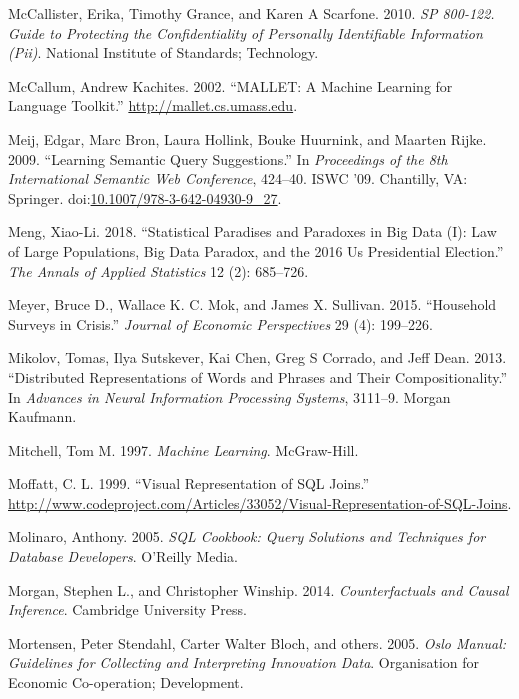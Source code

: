 \documentclass[]{krantz}
\begin{document}
\hypertarget{ref-mccallister2010sp}{}
McCallister, Erika, Timothy Grance, and Karen A Scarfone. 2010. \emph{SP
800-122. Guide to Protecting the Confidentiality of Personally
Identifiable Information (Pii)}. National Institute of Standards;
Technology.

\hypertarget{ref-mallet}{}
McCallum, Andrew Kachites. 2002. ``MALLET: A Machine Learning for
Language Toolkit.'' \url{http://mallet.cs.umass.edu}.

\hypertarget{ref-meij-09}{}
Meij, Edgar, Marc Bron, Laura Hollink, Bouke Huurnink, and Maarten
Rijke. 2009. ``Learning Semantic Query Suggestions.'' In
\emph{Proceedings of the 8th International Semantic Web Conference},
424--40. ISWC '09. Chantilly, VA: Springer.
doi:\href{https://doi.org/10.1007/978-3-642-04930-9_27}{10.1007/978-3-642-04930-9\_27}.

\hypertarget{ref-meng2018}{}
Meng, Xiao-Li. 2018. ``Statistical Paradises and Paradoxes in Big Data
(I): Law of Large Populations, Big Data Paradox, and the 2016 Us
Presidential Election.'' \emph{The Annals of Applied Statistics} 12 (2):
685--726.

\hypertarget{ref-Meyer2015}{}
Meyer, Bruce D., Wallace K. C. Mok, and James X. Sullivan. 2015.
``Household Surveys in Crisis.'' \emph{Journal of Economic Perspectives}
29 (4): 199--226.

\hypertarget{ref-mikolov-13}{}
Mikolov, Tomas, Ilya Sutskever, Kai Chen, Greg S Corrado, and Jeff Dean.
2013. ``Distributed Representations of Words and Phrases and Their
Compositionality.'' In \emph{Advances in Neural Information Processing
Systems}, 3111--9. Morgan Kaufmann.

\hypertarget{ref-mitchell1997machine}{}
Mitchell, Tom M. 1997. \emph{Machine Learning}. McGraw-Hill.

\hypertarget{ref-vizjoins}{}
Moffatt, C. L. 1999. ``Visual Representation of SQL Joins.''
\url{http://www.codeproject.com/Articles/33052/Visual-Representation-of-SQL-Joins}.

\hypertarget{ref-SQLCookbook}{}
Molinaro, Anthony. 2005. \emph{SQL Cookbook: Query Solutions and
Techniques for Database Developers}. O'Reilly Media.

\hypertarget{ref-morgan2014counterfactuals}{}
Morgan, Stephen L., and Christopher Winship. 2014. \emph{Counterfactuals
and Causal Inference}. Cambridge University Press.

\hypertarget{ref-oecd2005measurement}{}
Mortensen, Peter Stendahl, Carter Walter Bloch, and others. 2005.
\emph{Oslo Manual: Guidelines for Collecting and Interpreting Innovation
Data}. Organisation for Economic Co-operation; Development.
\end{document}
